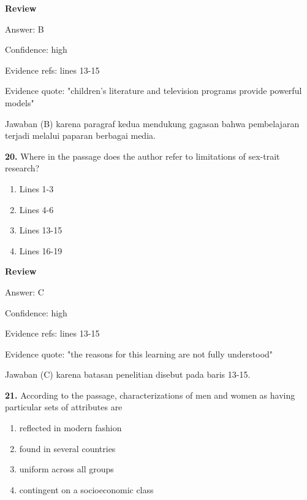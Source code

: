 \documentclass[12pt]{article}
\begin{document}
\par
\begingroup
\setlength{\parskip}{0pt}
\setlength{\parindent}{0pt}
\textbf{Review}\par
Answer: B\par
Confidence: high\par
Evidence refs: lines 13-15\par
Evidence quote: "children's literature and television programs provide powerful models"\par
Jawaban (B) karena paragraf kedua mendukung gagasan bahwa pembelajaran terjadi melalui paparan berbagai media.\par
\endgroup
\par
\vspace{0.25\baselineskip}
\noindent\textbf{20.} Where in the passage does the author refer to limitations of sex-trait research?
\begin{enumerate}[label=(\Alph*),leftmargin=*,itemsep=0.2em]
\item Lines 1-3
\item Lines 4-6
\item Lines 13-15
\item Lines 16-19
\end{enumerate}
\par
\begingroup
\setlength{\parskip}{0pt}
\setlength{\parindent}{0pt}
\textbf{Review}\par
Answer: C\par
Confidence: high\par
Evidence refs: lines 13-15\par
Evidence quote: "the reasons for this learning are not fully understood"\par
Jawaban (C) karena batasan penelitian disebut pada baris 13-15.\par
\endgroup
\par
\vspace{0.25\baselineskip}
\noindent\textbf{21.} According to the passage, characterizations of men and women as having particular sets of attributes are
\begin{enumerate}[label=(\Alph*),leftmargin=*,itemsep=0.2em]
\item reflected in modern fashion
\item found in several countries
\item uniform across all groups
\item contingent on a socioeconomic class
\end{enumerate}
\par
\begingroup
\end{document}
